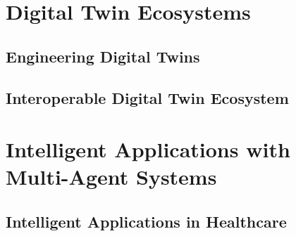 \documentclass[12pt,a4paper,openright,twoside]{book}
\begin{document}
\part{Digital Twin Ecosystems}

\chapter{Engineering Digital Twins}
\label{chap:engineering-digital-twins}


\chapter{Interoperable Digital Twin Ecosystem}
\label{chap:digital-twin-ecosystem}

\part{Intelligent Applications with Multi-Agent Systems}

\chapter{Intelligent Applications in Healthcare}
\label{chap:intelligent-applications-healthcare}
\end{document}
